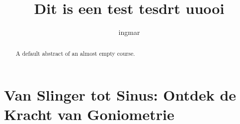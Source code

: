 \documentclass{xourse}
\title{Dit is een test tesdrt uuooi}
\author{ingmar}
\begin{document}
\begin{abstract}
    A default abstract of an almost empty course.
\end{abstract}

\maketitle


\part{Van Slinger tot Sinus: Ontdek de Kracht van Goniometrie}
\end{document}
